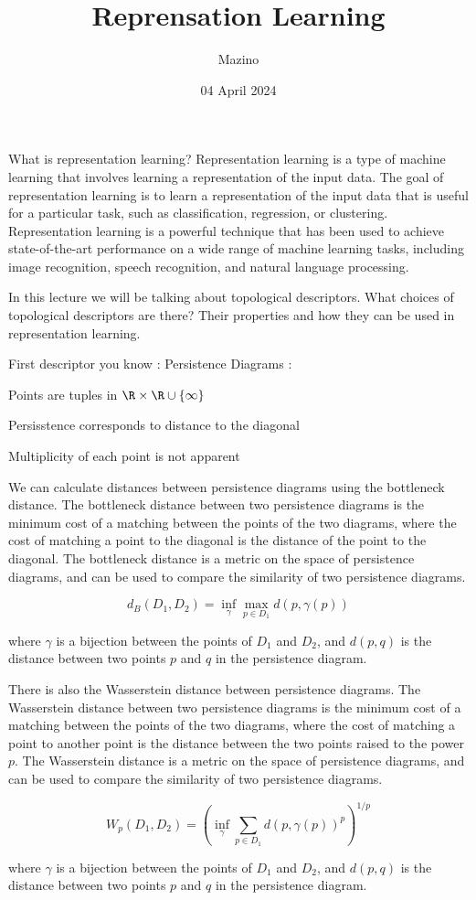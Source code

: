 \documentclass{article}
\title{Reprensation Learning}
\author{Mazino}
\date{04 April 2024}
\begin{document}
\maketitle

What is representation learning? Representation learning is a type of machine learning that involves learning a representation of the input data. The goal of representation learning is to learn a representation of the input data that is useful for a particular task, such as classification, regression, or clustering. Representation learning is a powerful technique that has been used to achieve state-of-the-art performance on a wide range of machine learning tasks, including image recognition, speech recognition, and natural language processing.

In this lecture we will be talking about topological descriptors. What choices of topological descriptors are there? Their properties and how they can be used in representation learning.


First descriptor you know : 
Persistence Diagrams :

Points are tuples in \(\R \times \R \cup \{\infty\} \)

Persisstence corresponds to distance to the diagonal

Multiplicity of each point is not apparent


We can calculate distances between persistence diagrams using the bottleneck distance. The bottleneck distance between two persistence diagrams is the minimum cost of a matching between the points of the two diagrams, where the cost of matching a point to the diagonal is the distance of the point to the diagonal. The bottleneck distance is a metric on the space of persistence diagrams, and can be used to compare the similarity of two persistence diagrams.

\[ d_B(D_1, D_2) = \inf_{\gamma} \max_{p \in D_1} d(p, \gamma(p)) \]

where \(\gamma\) is a bijection between the points of \(D_1\) and \(D_2\), and \(d(p, q)\) is the distance between two points \(p\) and \(q\) in the persistence diagram.

There is also the Wasserstein distance between persistence diagrams. The Wasserstein distance between two persistence diagrams is the minimum cost of a matching between the points of the two diagrams, where the cost of matching a point to another point is the distance between the two points raised to the power \(p\). The Wasserstein distance is a metric on the space of persistence diagrams, and can be used to compare the similarity of two persistence diagrams.

\[ W_p(D_1, D_2) = \left( \inf_{\gamma} \sum_{p \in D_1} d(p, \gamma(p))^p \right)^{1/p} \]

where \(\gamma\) is a bijection between the points of \(D_1\) and \(D_2\), and \(d(p, q)\) is the distance between two points \(p\) and \(q\) in the persistence diagram.
\end{document}
